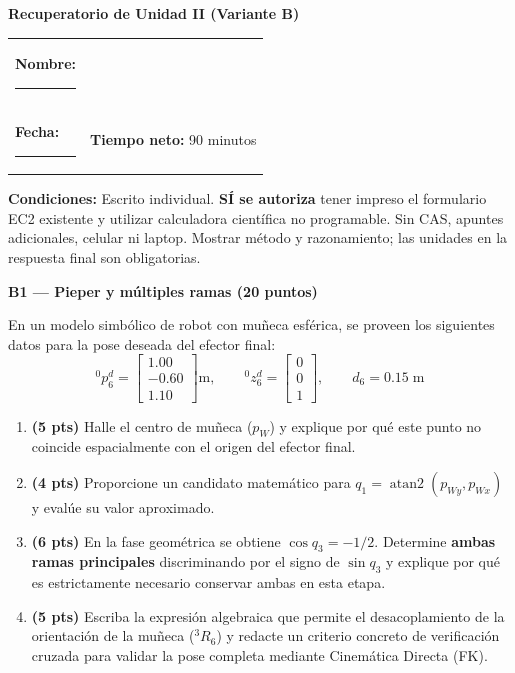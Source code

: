 \documentclass[11pt, a4paper]{article}
\begin{document}
\begin{center}
    \Large\textbf{\textcolor{ucbblue}{Recuperatorio de Unidad II (Variante B)}}
\end{center}

\vspace{0.2cm}
\noindent\begin{tabular}{ll}
\textbf{Nombre:} \rule{7cm}{0.15mm} \\
\textbf{Fecha:} \rule{4cm}{0.15mm} & \textbf{Tiempo neto:} 90 minutos
\end{tabular}

\vspace{0.3cm}
\begin{tcolorbox}[colback=green!5, colframe=green!50!black, left=2mm, right=2mm, top=1mm, bottom=1mm]
    \small\textbf{Condiciones:} Escrito individual. \textbf{SÍ se autoriza} tener impreso el formulario EC2 existente y utilizar calculadora científica no programable. Sin CAS, apuntes adicionales, celular ni laptop. Mostrar método y razonamiento; las unidades en la respuesta final son obligatorias.
\end{tcolorbox}

\vspace{0.3cm}
\noindent\textbf{\large B1 — Pieper y múltiples ramas (20 puntos)}

En un modelo simbólico de robot con muñeca esférica, se proveen los siguientes datos para la pose deseada del efector final:
\begin{equation*}
    {}^0p_6^d=\begin{bmatrix}1.00\\-0.60\\1.10\end{bmatrix}\mathrm{m},\qquad
    {}^0z_6^d=\begin{bmatrix}0\\0\\1\end{bmatrix},\qquad d_6=0.15\;\mathrm{m}
\end{equation*}

\begin{enumerate}
    \item \textbf{(5 pts)} Halle el centro de muñeca ($p_W$) y explique por qué este punto no coincide espacialmente con el origen del efector final.
    \item \textbf{(4 pts)} Proporcione un candidato matemático para $q_1 = \operatorname{atan2}(p_{Wy}, p_{Wx})$ y evalúe su valor aproximado.
    \item \textbf{(6 pts)} En la fase geométrica se obtiene $\cos q_3 = -1/2$. Determine \textbf{ambas ramas principales} discriminando por el signo de $\sin q_3$ y explique por qué es estrictamente necesario conservar ambas en esta etapa.
    \item \textbf{(5 pts)} Escriba la expresión algebraica que permite el desacoplamiento de la orientación de la muñeca (${}^3R_6$) y redacte un criterio concreto de verificación cruzada para validar la pose completa mediante Cinemática Directa (FK).
\end{enumerate}
\end{document}
